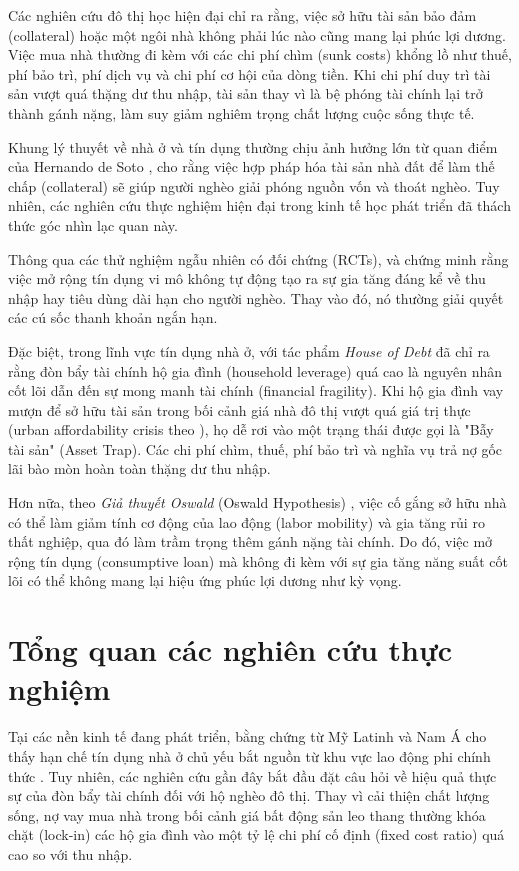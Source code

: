 \documentclass[12pt,a4paper]{report}
\begin{document}
Các nghiên cứu đô thị học hiện đại chỉ ra rằng, việc sở hữu tài sản bảo đảm (collateral) hoặc một ngôi nhà không phải lúc nào cũng mang lại phúc lợi dương. Việc mua nhà thường đi kèm với các chi phí chìm (sunk costs) khổng lồ như thuế, phí bảo trì, phí dịch vụ và chi phí cơ hội của dòng tiền. Khi chi phí duy trì tài sản vượt quá thặng dư thu nhập, tài sản thay vì là bệ phóng tài chính lại trở thành gánh nặng, làm suy giảm nghiêm trọng chất lượng cuộc sống thực tế.

Khung lý thuyết về nhà ở và tín dụng thường chịu ảnh hưởng lớn từ quan điểm của Hernando de Soto \parencite{deSoto2000}, cho rằng việc hợp pháp hóa tài sản nhà đất để làm thế chấp (collateral) sẽ giúp người nghèo giải phóng nguồn vốn và thoát nghèo. Tuy nhiên, các nghiên cứu thực nghiệm hiện đại trong kinh tế học phát triển đã thách thức góc nhìn lạc quan này.

Thông qua các thử nghiệm ngẫu nhiên có đối chứng (RCTs), \textcite{Banerjee2015} và \textcite{Karlan2010} chứng minh rằng việc mở rộng tín dụng vi mô không tự động tạo ra sự gia tăng đáng kể về thu nhập hay tiêu dùng dài hạn cho người nghèo. Thay vào đó, nó thường giải quyết các cú sốc thanh khoản ngắn hạn.

Đặc biệt, trong lĩnh vực tín dụng nhà ở, \textcite{Mian2014} với tác phẩm \textit{House of Debt} đã chỉ ra rằng đòn bẩy tài chính hộ gia đình (household leverage) quá cao là nguyên nhân cốt lõi dẫn đến sự mong manh tài chính (financial fragility). Khi hộ gia đình vay mượn để sở hữu tài sản trong bối cảnh giá nhà đô thị vượt quá giá trị thực (urban affordability crisis theo \textcite{Glaeser2018}), họ dễ rơi vào một trạng thái được gọi là "Bẫy tài sản" (Asset Trap). Các chi phí chìm, thuế, phí bảo trì và nghĩa vụ trả nợ gốc lãi bào mòn hoàn toàn thặng dư thu nhập. 

Hơn nữa, theo \textit{Giả thuyết Oswald} (Oswald Hypothesis) \parencite{Oswald1996}, việc cố gắng sở hữu nhà có thể làm giảm tính cơ động của lao động (labor mobility) và gia tăng rủi ro thất nghiệp, qua đó làm trầm trọng thêm gánh nặng tài chính. Do đó, việc mở rộng tín dụng (consumptive loan) mà không đi kèm với sự gia tăng năng suất cốt lõi có thể không mang lại hiệu ứng phúc lợi dương như kỳ vọng.

\section{Tổng quan các nghiên cứu thực nghiệm}

Tại các nền kinh tế đang phát triển, bằng chứng từ Mỹ Latinh và Nam Á cho thấy hạn chế tín dụng nhà ở chủ yếu bắt nguồn từ khu vực lao động phi chính thức \parencite{arrieta2005Mortgage,sharma2024saving}. Tuy nhiên, các nghiên cứu gần đây bắt đầu đặt câu hỏi về hiệu quả thực sự của đòn bẩy tài chính đối với hộ nghèo đô thị. Thay vì cải thiện chất lượng sống, nợ vay mua nhà trong bối cảnh giá bất động sản leo thang thường khóa chặt (lock-in) các hộ gia đình vào một tỷ lệ chi phí cố định (fixed cost ratio) quá cao so với thu nhập.
\end{document}
